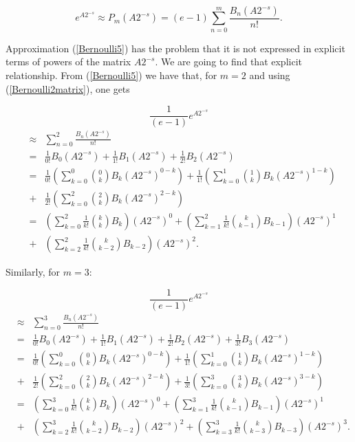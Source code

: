 \documentclass[preprint,10pt,numbers,sort&compress]{elsarticle}
\begin{document}
\begin{equation}\label{Bernoulli5}
e^{A 2^{-s}}\approx  P_{m}(A2^{-s})=\left(e-1 \right)\sum_{n=0}^m \frac{B_n\left(A 2^{-s}\right)}{n!}.
\end{equation}


Approximation (\ref{Bernoulli5}) has the problem that it is not expressed in explicit terms of powers of the matrix $A2^{-s}$. We are going to find that explicit relationship. From
(\ref{Bernoulli5}) we have that, for $m=2$ and using (\ref{Bernoulli2matrix}), one gets



$$
\frac{1}{\left(e-1 \right)}e^{A 2^{-s}}
$$
\begin{eqnarray*}
 & \approx & \sum_{n=0}^2 \frac{B_n\left(A 2^{-s}\right)}{n!} \\
& = & \frac{1}{0!} B_0\left(A 2^{-s}\right) + \frac{1}{1!} B_1\left(A 2^{-s}\right)+ \frac{1}{2!} B_2\left(A 2^{-s}\right) \\
&=& \frac{1}{0!} \left(\sum_{k=0}^{0} {0 \choose k} B_k \left(A 2^{-s}\right)^{0-k} \right) +  \frac{1}{1!} \left(\sum_{k=0}^{1} {1 \choose k} B_k \left(A 2^{-s}\right)^{1-k} \right)\\
&+&  \frac{1}{2!} \left(\sum_{k=0}^{2} {2 \choose k} B_k \left(A 2^{-s}\right)^{2-k} \right) \\
&=& \left(\sum_{k=0}^{2} \frac{1}{k!} {k \choose k} B_k \right) \left(A 2^{-s}\right)^0 + \left(\sum_{k=1}^{2} \frac{1}{k!} {k \choose k-1} B_{k-1} \right) \left(A 2^{-s}\right)^1\\
&+& \left(\sum_{k=2}^{2} \frac{1}{k!} {k \choose k-2} B_{k-2} \right) \left(A 2^{-s}\right)^2.
\end{eqnarray*}

Similarly, for $m=3$:

$$
\frac{1}{\left(e-1 \right)}e^{A 2^{-s}}
$$
\begin{eqnarray*}
& \approx & \sum_{n=0}^3 \frac{B_n\left(A 2^{-s}\right)}{n!} \\
& = & \frac{1}{0!} B_0\left(A 2^{-s}\right) + \frac{1}{1!} B_1\left(A 2^{-s}\right)+ \frac{1}{2!} B_2\left(A 2^{-s}\right)+\frac{1}{3!} B_3\left(A 2^{-s}\right) \\
&=& \frac{1}{0!} \left(\sum_{k=0}^{0} {0 \choose k} B_k \left(A 2^{-s}\right)^{0-k} \right) +  \frac{1}{1!} \left(\sum_{k=0}^{1} {1 \choose k} B_k \left(A 2^{-s}\right)^{1-k} \right)\\
&+&  \frac{1}{2!} \left(\sum_{k=0}^{2} {2 \choose k} B_k \left(A 2^{-s}\right)^{2-k} \right) +  \frac{1}{3!} \left(\sum_{k=0}^{3} {3 \choose k} B_k \left(A 2^{-s}\right)^{3-k} \right)  \\
&=& \left(\sum_{k=0}^{3} \frac{1}{k!} {k \choose k} B_k \right) \left(A 2^{-s}\right)^0 + \left(\sum_{k=1}^{3} \frac{1}{k!} {k \choose k-1} B_{k-1} \right) \left(A 2^{-s}\right)^1 \\
&+& \left(\sum_{k=2}^{3} \frac{1}{k!} {k \choose k-2} B_{k-2} \right) \left(A 2^{-s}\right)^2+\left(\sum_{k=3}^{3} \frac{1}{k!} {k \choose k-3} B_{k-3} \right) \left(A 2^{-s}\right)^3.
\end{eqnarray*}
\end{document}
